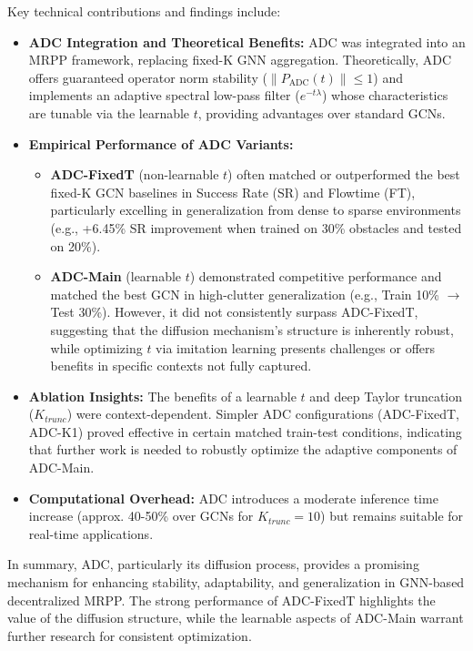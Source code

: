 Key technical contributions and findings include:
\begin{itemize}
    \item \textbf{ADC Integration and Theoretical Benefits:} ADC was integrated into an MRPP framework, replacing fixed-K GNN aggregation. Theoretically, ADC offers guaranteed operator norm stability ($\|P_{\mathrm{ADC}}(t)\| \le 1$) and implements an adaptive spectral low-pass filter ($e^{-t\lambda}$) whose characteristics are tunable via the learnable $t$, providing advantages over standard GCNs.
    \item \textbf{Empirical Performance of ADC Variants:}
        \begin{itemize}
            \item \textbf{ADC-FixedT} (non-learnable $t$) often matched or outperformed the best fixed-K GCN baselines in Success Rate (SR) and Flowtime (FT), particularly excelling in generalization from dense to sparse environments (e.g., +6.45\% SR improvement when trained on 30\% obstacles and tested on 20\%).
            \item \textbf{ADC-Main} (learnable $t$) demonstrated competitive performance and matched the best GCN in high-clutter generalization (e.g., Train 10\% $\rightarrow$ Test 30\%). However, it did not consistently surpass ADC-FixedT, suggesting that the diffusion mechanism's structure is inherently robust, while optimizing $t$ via imitation learning presents challenges or offers benefits in specific contexts not fully captured.
        \end{itemize}
    \item \textbf{Ablation Insights:} The benefits of a learnable $t$ and deep Taylor truncation ($K_{trunc}$) were context-dependent. Simpler ADC configurations (ADC-FixedT, ADC-K1) proved effective in certain matched train-test conditions, indicating that further work is needed to robustly optimize the adaptive components of ADC-Main.
    \item \textbf{Computational Overhead:} ADC introduces a moderate inference time increase (approx. 40-50\% over GCNs for $K_{trunc}=10$) but remains suitable for real-time applications.
\end{itemize}
In summary, ADC, particularly its diffusion process, provides a promising mechanism for enhancing stability, adaptability, and generalization in GNN-based decentralized MRPP. The strong performance of ADC-FixedT highlights the value of the diffusion structure, while the learnable aspects of ADC-Main warrant further research for consistent optimization.

